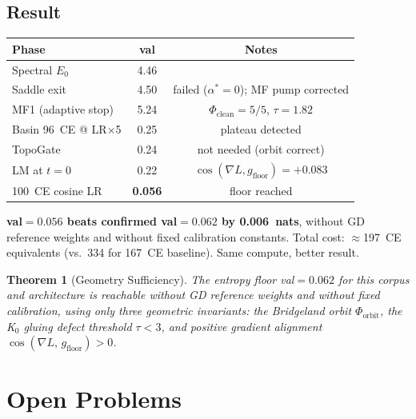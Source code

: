 \documentclass[11pt]{amsart}
\newtheorem{theorem}{Theorem}[section]
\begin{document}
\subsection{Result}

\begin{center}
\small
\begin{tabular}{lcc}
\toprule
Phase & val & Notes \\
\midrule
Spectral $E_0$ & 4.46 & \\
Saddle exit & 4.50 & failed ($\alpha^*=0$); MF pump corrected \\
MF1 (adaptive stop) & 5.24 & $\Phi_\mathrm{clean}=5/5$, $\tau=1.82$ \\
Basin 96~CE @ LR$\times$5 & 0.25 & plateau detected \\
TopoGate & 0.24 & not needed (orbit correct) \\
LM at $t=0$ & 0.22 & $\cos(\nabla L, g_\mathrm{floor})=+0.083$ \\
100~CE cosine LR & \textbf{0.056} & floor reached \\
\bottomrule
\end{tabular}
\end{center}

\textbf{val$=0.056$ beats confirmed val$=0.062$ by 0.006~nats},
without GD reference weights and without fixed calibration constants.
Total cost: $\approx$197~CE equivalents (vs.\ 334 for 167~CE baseline).
Same compute, better result.

\begin{theorem}[Geometry Sufficiency]
The entropy floor val$=0.062$ for this corpus and architecture
is reachable without GD reference weights and without fixed calibration,
using only three geometric invariants:
the Bridgeland orbit $\Phi_\mathrm{orbit}$,
the K$_0$ gluing defect threshold $\tau < 3$,
and positive gradient alignment $\cos(\nabla L,\, g_\mathrm{floor}) > 0$.
\end{theorem}

\section{Open Problems}
\label{sec:open}
\end{document}

